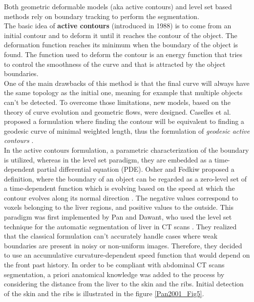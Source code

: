 \documentclass[]{article}
\begin{document}
	Both geometric deformable models (aka active contours) and level set
	based methods rely on boundary tracking to perform the segmentation.\\
	The basic idea of \textbf{active contours} (introduced in 1988) is to
	come from an initial contour and to deform it until it reaches the
	contour of the object. The deformation function reaches its minimum when
	the boundary of the object is found. The function used to deform the
	contour is an energy function that tries to control the smoothness of
	the curve and that is attracted by the object boundaries.\\
	One of the main drawbacks of this method is that the final curve will
	always have the same topology as the initial one, meaning for example
	that multiple objects can't be detected. To overcome those limitations,
	new models, based on the theory of curve evolution and geometric flows,
	were designed.
	Caselles et al. proposed a formulation where finding the contour will be
	equivalent to finding a geodesic curve of minimal weighted length, thus
	the formulation of \emph{geodesic active contours} \cite{Caselles1997}.\\
	In the active contours formulation, a parametric characterization of the
	boundary is utilized, whereas in the level set paradigm, they are
	embedded as a time-dependent partial differential equation (PDE).
	Osher and Fedkiw proposed a definition, where the boundary of an object
	can be regarded as a zero-level set of a time-dependent function which
	is evolving based on the speed at which the contour evolves along its
	normal direction \cite{Osher2003}. The negative values correspond to voxels belonging to
	the liver regions, and positive values to the outside. This paradigm was
	first implemented by
	Pan and Dawant, who used the level set technique for the automatic segmentation of liver
	in CT scans \cite{Pan2001}. They realized that the classical formulation can't
	accurately handle cases where weak boundaries are present in noisy or
	non-uniform images. Therefore, they decided to use an accumulative
	curvature-dependent speed function that would depend on the front past
	history. In order to be compliant with abdominal CT scans segmentation,
	a priori anatomical knowledge was added to the process by considering
	the distance from the liver to the skin and the ribs. Initial detection
	of the skin and the ribs is illustrated in the figure \ref{Pan2001_Fig5}.
	
\end{document}
